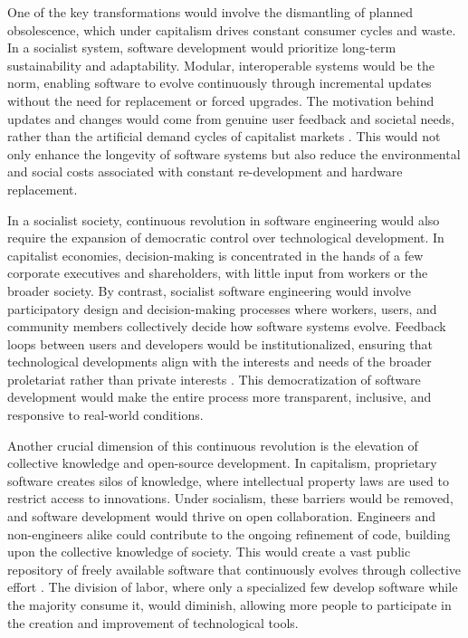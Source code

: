 \begin{refsection}
One of the key transformations would involve the dismantling of planned obsolescence, which under capitalism drives constant consumer cycles and waste. In a socialist system, software development would prioritize long-term sustainability and adaptability. Modular, interoperable systems would be the norm, enabling software to evolve continuously through incremental updates without the need for replacement or forced upgrades. The motivation behind updates and changes would come from genuine user feedback and societal needs, rather than the artificial demand cycles of capitalist markets \cite[pp.~103-105]{cockshott1993}. This would not only enhance the longevity of software systems but also reduce the environmental and social costs associated with constant re-development and hardware replacement.

In a socialist society, continuous revolution in software engineering would also require the expansion of democratic control over technological development. In capitalist economies, decision-making is concentrated in the hands of a few corporate executives and shareholders, with little input from workers or the broader society. By contrast, socialist software engineering would involve participatory design and decision-making processes where workers, users, and community members collectively decide how software systems evolve. Feedback loops between users and developers would be institutionalized, ensuring that technological developments align with the interests and needs of the broader proletariat rather than private interests \cite[pp.~200-203]{stallman2010}. This democratization of software development would make the entire process more transparent, inclusive, and responsive to real-world conditions.

Another crucial dimension of this continuous revolution is the elevation of collective knowledge and open-source development. In capitalism, proprietary software creates silos of knowledge, where intellectual property laws are used to restrict access to innovations. Under socialism, these barriers would be removed, and software development would thrive on open collaboration. Engineers and non-engineers alike could contribute to the ongoing refinement of code, building upon the collective knowledge of society. This would create a vast public repository of freely available software that continuously evolves through collective effort \cite[pp.~45-48]{wark2019}. The division of labor, where only a specialized few develop software while the majority consume it, would diminish, allowing more people to participate in the creation and improvement of technological tools.


\end{refsection}
